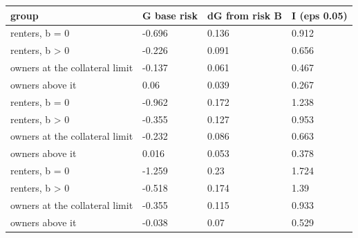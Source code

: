 \begingroup\small
\setlength{\tabcolsep}{3pt}
\renewcommand{\arraystretch}{1.04}
\begin{tabularx}{\linewidth}{XXXX}
\toprule
group & G base risk & dG from risk B & I (eps 0.05) \\
\midrule
renters, b = 0 & -0.696 & 0.136 & 0.912 \\
renters, b \textgreater{} 0 & -0.226 & 0.091 & 0.656 \\
owners at the collateral limit & -0.137 & 0.061 & 0.467 \\
owners above it & 0.06 & 0.039 & 0.267 \\
renters, b = 0 & -0.962 & 0.172 & 1.238 \\
renters, b \textgreater{} 0 & -0.355 & 0.127 & 0.953 \\
owners at the collateral limit & -0.232 & 0.086 & 0.663 \\
owners above it & 0.016 & 0.053 & 0.378 \\
renters, b = 0 & -1.259 & 0.23 & 1.724 \\
renters, b \textgreater{} 0 & -0.518 & 0.174 & 1.39 \\
owners at the collateral limit & -0.355 & 0.115 & 0.933 \\
owners above it & -0.038 & 0.07 & 0.529 \\
\bottomrule
\end{tabularx}
\endgroup
